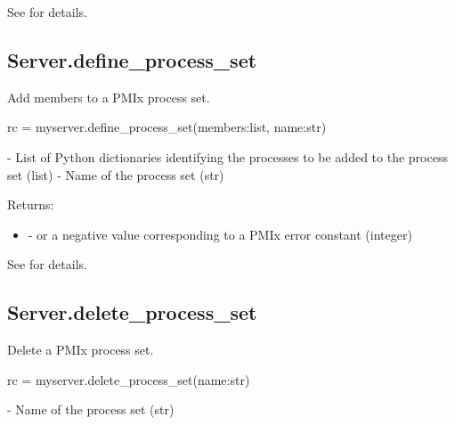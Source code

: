 See  for details.


\subsection{Server.define_process_set}

\summary
Add members to a \ac{PMIx} process set.

\format

\pyspecificstart
\begin{codepar}
rc = myserver.define_process_set(members:list, name:str)
\end{codepar}
\pyspecificend


\begin{arglist}
 - List of Python  dictionaries identifying the processes to be added to the process set (list)
 - Name of the process set (str)
\end{arglist}

Returns:

\begin{itemize}
    \item {} -  or a negative value corresponding to a PMIx error constant (integer)
\end{itemize}

See  for details.


\subsection{Server.delete_process_set}

\summary
Delete a \ac{PMIx} process set.

\format

\pyspecificstart
\begin{codepar}
rc = myserver.delete_process_set(name:str)
\end{codepar}
\pyspecificend


\begin{arglist}
 - Name of the process set (str)
\end{arglist}

